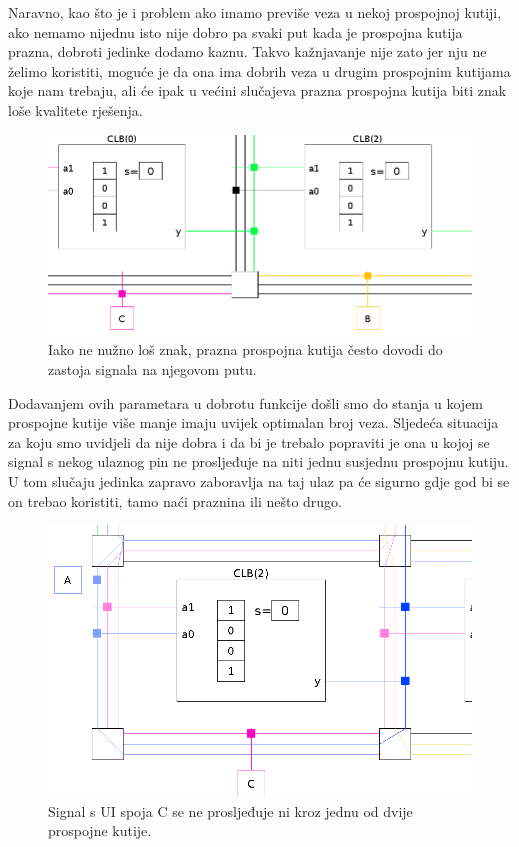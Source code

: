 \documentclass[times, utf8, zavrsni]{fer}
\begin{document}
Naravno, kao što je i problem ako imamo previše veza u nekoj prospojnoj kutiji, ako nemamo nijednu isto nije dobro pa svaki put kada je prospojna kutija prazna, dobroti jedinke dodamo kaznu. Takvo kažnjavanje nije zato jer nju ne želimo koristiti, moguće je da ona ima dobrih veza u drugim prospojnim kutijama koje nam trebaju, ali će ipak u većini slučajeva prazna prospojna kutija biti znak loše kvalitete rješenja. 


\begin{figure}[H]
	\centering
	\includegraphics[width=18cm]{slike/isjecakPraznog.png}
	\caption{Iako ne nužno loš znak, prazna prospojna kutija često dovodi do zastoja signala na njegovom putu.}
	\label{fig:prazna-skatula-isjecak}
\end{figure} 

Dodavanjem ovih parametara u dobrotu funkcije došli smo do stanja u kojem prospojne kutije više manje imaju uvijek optimalan broj veza. Sljedeća situacija za koju smo uvidjeli da nije dobra i da bi je trebalo popraviti je ona u kojoj se signal s nekog ulaznog pin ne prosljeđuje na niti jednu susjednu prospojnu kutiju. U tom slučaju jedinka zapravo zaboravlja na taj ulaz pa će sigurno gdje god bi se on trebao koristiti, tamo naći praznina ili nešto drugo. 



\begin{figure}[H]
	\centering
	\includegraphics[width=18cm]{slike/isjecakCNikamo.png}
	\caption{Signal s UI spoja C se ne prosljeđuje ni kroz jednu od dvije prospojne kutije. }
	\label{fig:isjecak-c-nikamo}
\end{figure} 
\end{document}
